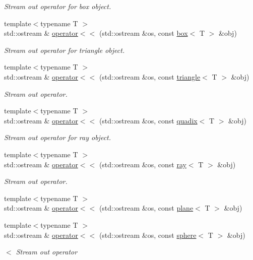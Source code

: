 \begin{DoxyCompactItemize}
\begin{DoxyCompactList}\small\item\em Stream out operator for box object. \end{DoxyCompactList}\item 
{\footnotesize template$<$typename T $>$ }\\std\+::ostream \& \hyperlink{namespaceddd_af710b0f11be50190553c743ce86545a3}{operator$<$$<$} (std\+::ostream \&os, const \hyperlink{classddd_1_1box}{box}$<$ T $>$ \&obj)
\begin{DoxyCompactList}\small\item\em Stream out operator for triangle object. \end{DoxyCompactList}\item 
{\footnotesize template$<$typename T $>$ }\\std\+::ostream \& \hyperlink{namespaceddd_a3a6f828f85e4fa306f0d950f1aab4f64}{operator$<$$<$} (std\+::ostream \&os, const \hyperlink{classddd_1_1triangle}{triangle}$<$ T $>$ \&obj)
\begin{DoxyCompactList}\small\item\em Stream out operator. \end{DoxyCompactList}\item 
{\footnotesize template$<$typename T $>$ }\\std\+::ostream \& \hyperlink{namespaceddd_a58ae88cefdf3b919e400db6de59f4cfc}{operator$<$$<$} (std\+::ostream \&os, const \hyperlink{classddd_1_1quadix}{quadix}$<$ T $>$ \&obj)
\begin{DoxyCompactList}\small\item\em Stream out operator for ray object. \end{DoxyCompactList}\item 
{\footnotesize template$<$typename T $>$ }\\std\+::ostream \& \hyperlink{namespaceddd_ae2604d6c72853dfb2595f6882cbc7a51}{operator$<$$<$} (std\+::ostream \&os, const \hyperlink{classddd_1_1ray}{ray}$<$ T $>$ \&obj)
\begin{DoxyCompactList}\small\item\em Stream out operator. \end{DoxyCompactList}\item 
{\footnotesize template$<$typename T $>$ }\\std\+::ostream \& \hyperlink{namespaceddd_af1faa02295670c7cfd7f0278e3973f84}{operator$<$$<$} (std\+::ostream \&os, const \hyperlink{classddd_1_1plane}{plane}$<$ T $>$ \&obj)
\item 
{\footnotesize template$<$typename T $>$ }\\std\+::ostream \& \hyperlink{namespaceddd_a64dbb41c0ee377eb528907f3448514f6}{operator$<$$<$} (std\+::ostream \&os, const \hyperlink{classddd_1_1sphere}{sphere}$<$ T $>$ \&obj)
\begin{DoxyCompactList}\small\item\em $<$ Stream out operator \end{DoxyCompactList}\end{DoxyCompactItemize}


